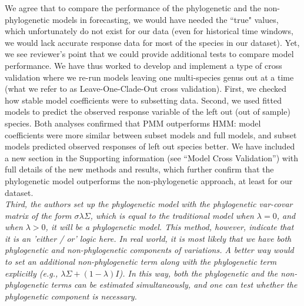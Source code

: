 \documentclass[11pt]{article}
\begin{document}
We agree that to compare the performance of the phylogenetic and the non-phylogenetic models in forecasting, we would have needed the ``true" values, which unfortunately do not exist for our data (even for historical time windows, we would lack accurate response data for most of the species in our dataset). Yet, we see reviewer's point that we could provide additional tests to compare model performance. We have thus worked to develop and implement a type of cross validation where we re-run models leaving one multi-species genus out at a time (what we refer to as Leave-One-Clade-Out cross validation). First, we checked how stable model coefficients were to subsetting data. Second, we used fitted models to predict the observed response variable of the left out (out of sample) species. Both analyses confirmed that PMM outperforms HMM: model coefficients were more similar between subset models and full models, and subset models predicted observed responses of left out species better. We have included a new section in the Supporting information (see ``Model Cross Validation'') with full details of the new methods and results, which further confirm that the phylogenetic model outperforms the non-phylogenetic approach, at least for our dataset.\\

\emph{Third, the authors set up the phylogenetic model with the phylogenetic var-covar matrix of the form $\sigma\lambda\Sigma$, which is equal to the traditional model when $\lambda=0$, and when $\lambda>0$, it will be a phylogenetic model. This method, however, indicate that it is an 'either / or' logic here. In real world, it is most likely that we have both phylogenetic and non-phylogenetic components of variations. A better way would to set an additional non-phylogenetic term along with the phylogenetic term explicitly (e.g., $\lambda \Sigma + (1-\lambda)I$). In this way, both the phylogenetic and the non-phylogenetic terms can be estimated simultaneously, and one can test whether the phylogenetic component is necessary.}\\
\end{document}
